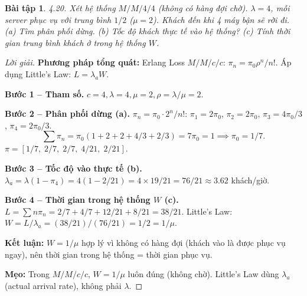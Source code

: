 \documentclass[8pt,a4paper]{article}
\newtheorem{exercise}{Bài tập}
\newenvironment{solution}{\begin{proof}[Lời giải]}{\end{proof}}
\begin{document}
\begin{exercise}
4.20. Xét hệ thống $M/M/4/4$ (không có hàng đợi chờ). $\lambda = 4$, mỗi server phục vụ với trung bình $1/2$ ($\mu = 2$). Khách đến khi 4 máy bận sẽ rời đi.
(a) Tìm phân phối dừng. (b) Tốc độ khách thực tế vào hệ thống? (c) Tính thời gian trung bình khách ở trong hệ thống $W$.
\end{exercise}
\begin{solution}
\textbf{Phương pháp tổng quát:} Erlang Loss $M/M/c/c$: $\pi_n = \pi_0 \rho^n/n!$. Áp dụng Little's Law: $L = \lambda_a W$.

\textbf{Bước 1 -- Tham số.} $c = 4, \lambda = 4, \mu = 2, \rho = \lambda/\mu = 2$.

\textbf{Bước 2 -- Phân phối dừng (a).}
$\pi_n = \pi_0 \cdot 2^n/n!$: \quad $\pi_1 = 2\pi_0$, $\pi_2 = 2\pi_0$, $\pi_3 = 4\pi_0/3$, $\pi_4 = 2\pi_0/3$.
\[
\sum \pi_n = \pi_0(1+2+2+4/3+2/3) = 7\pi_0 = 1 \implies \pi_0 = 1/7.
\]
$\boxed{\pi = [1/7,\; 2/7,\; 2/7,\; 4/21,\; 2/21]}$.

\textbf{Bước 3 -- Tốc độ vào thực tế (b).}
$\lambda_a = \lambda(1 - \pi_4) = 4(1 - 2/21) = 4 \times 19/21 = \boxed{76/21 \approx 3.62}$ khách/giờ.

\textbf{Bước 4 -- Thời gian trong hệ thống $W$ (c).} $L = \sum n\pi_n = 2/7 + 4/7 + 12/21 + 8/21 = 38/21$.
Little's Law: $W = L/\lambda_a = (38/21)/(76/21) = \boxed{1/2 = 1/\mu}$.

\textbf{Kết luận:} $W = 1/\mu$ hợp lý vì không có hàng đợi (khách vào là được phục vụ ngay), nên thời gian trong hệ thống = thời gian phục vụ.

\textbf{Mẹo:} Trong $M/M/c/c$, $W = 1/\mu$ luôn đúng (không chờ). Little's Law dùng $\lambda_a$ (actual arrival rate), không phải $\lambda$.
\end{solution}
\end{document}
